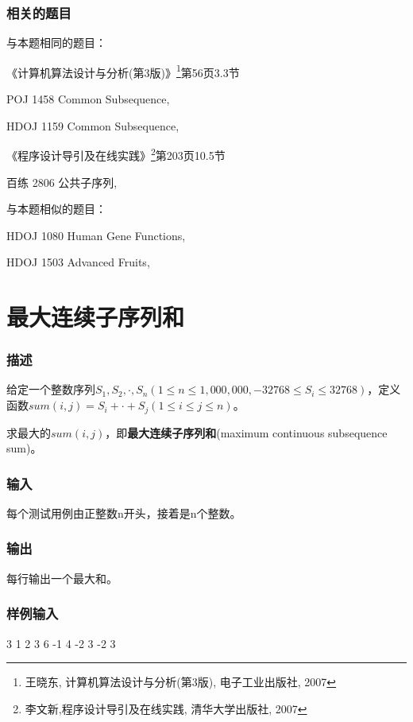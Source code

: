 \subsubsection{相关的题目}
与本题相同的题目：
\begindot
\item 《计算机算法设计与分析(第3版)》\footnote{王晓东, 计算机算法设计与分析(第3版), 电子工业出版社, 2007}第56页3.3节
\item POJ 1458 Common Subsequence, 
\item HDOJ 1159 Common Subsequence, 
\item 《程序设计导引及在线实践》\footnote{李文新,程序设计导引及在线实践, 清华大学出版社, 2007}第203页10.5节
\item 百练 2806 公共子序列, 
\myenddot

与本题相似的题目：
\begindot
\item HDOJ 1080 Human Gene Functions, 
\item HDOJ 1503 Advanced Fruits, 
\myenddot


\section{最大连续子序列和} %
\subsubsection{描述}
给定一个整数序列$S_1,S_2,\cdot,S_n(1 \leq n \leq 1,000,000, -32768 \leq S_i \leq 32768)$，定义函数$sum(i,j)=S_i+\cdot+S_j(1 \leq i \leq j \leq n)$。

求最大的$sum(i,j)$，即\textbf{最大连续子序列和}(maximum continuous subsequence sum)。

\subsubsection{输入}
每个测试用例由正整数n开头，接着是n个整数。

\subsubsection{输出}
每行输出一个最大和。

\subsubsection{样例输入}
\begin{Code}
3 1 2 3
6 -1 4 -2 3 -2 3
\end{Code}

